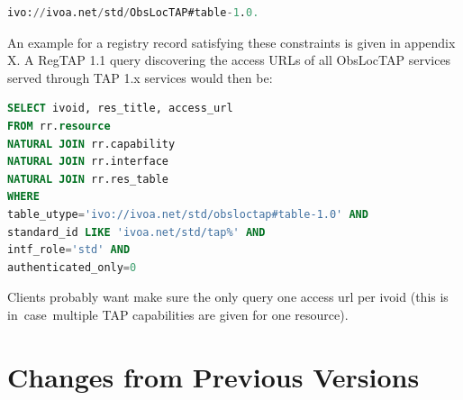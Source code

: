 \documentclass[11pt,a4paper]{ivoa}
\begin{document}
\begin{lstlisting}[language=SQL]
ivo://ivoa.net/std/ObsLocTAP#table-1.0.
\end{lstlisting}


An example for a registry record satisfying these constraints is given in appendix X. 
A RegTAP 1.1 query discovering the access URLs of all ObsLocTAP services served through 
TAP 1.x services would then be:      

\begin{lstlisting}[language=SQL]
SELECT ivoid, res_title, access_url
FROM rr.resource
NATURAL JOIN rr.capability
NATURAL JOIN rr.interface
NATURAL JOIN rr.res_table
WHERE 
table_utype='ivo://ivoa.net/std/obsloctap#table-1.0' AND
standard_id LIKE 'ivoa.net/std/tap%' AND
intf_role='std' AND
authenticated_only=0
\end{lstlisting}
Clients probably want make sure the only query one access url per ivoid (this is in\ 
case\ multiple TAP capabilities are given for one resource).
\par

\appendix
\section{Changes from Previous Versions}

\end{document}
